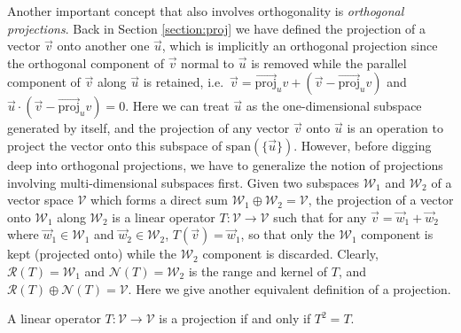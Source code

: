 Another important concept that also involves orthogonality is \textit{orthogonal projections}. Back in Section \ref{section:proj} we have defined the projection of a vector $\vec{v}$ onto another one $\vec{u}$, which is implicitly an orthogonal projection since the orthogonal component of $\vec{v}$ normal to $\vec{u}$ is removed while the parallel component of $\vec{v}$ along $\vec{u}$ is retained, i.e.\ $\vec{v} = \overrightarrow{\text{proj}}_u v + (\vec{v} - \overrightarrow{\text{proj}}_u v)$ and $\vec{u} \cdot (\vec{v} - \overrightarrow{\text{proj}}_u v) = 0$. Here we can treat $\vec{u}$ as the one-dimensional subspace generated by itself, and the projection of any vector $\vec{v}$ onto $\vec{u}$ is an operation to project the vector onto this subspace of $\text{span}(\{\vec{u}\})$. However, before digging deep into orthogonal projections, we have to generalize the notion of projections involving multi-dimensional subspaces first. Given two subspaces $\mathcal{W}_1$ and $\mathcal{W}_2$ of a vector space $\mathcal{V}$ which forms a direct sum $\mathcal{W}_1 \oplus \mathcal{W}_2 = \mathcal{V}$, the projection of a vector onto $\mathcal{W}_1$ along $\mathcal{W}_2$ is a linear operator $T:\mathcal{V} \to \mathcal{V}$ such that for any $\vec{v} = \vec{w}_1 + \vec{w}_2$ where $\vec{w}_1 \in \mathcal{W}_1$ and $\vec{w}_2 \in \mathcal{W}_2$, $T(\vec{v}) = \vec{w}_1$, so that only the $\mathcal{W}_1$ component is kept (projected onto) while the $\mathcal{W}_2$ component is discarded. Clearly, $\mathcal{R}(T) = \mathcal{W}_1$ and $\mathcal{N}(T) = \mathcal{W}_2$ is the range and kernel of $T$, and $\mathcal{R}(T) \oplus \mathcal{N}(T) = \mathcal{V}$. Here we give another equivalent definition of a projection.
\begin{proper}[Projection]
\label{proper:matrixproj}
A linear operator $T: \mathcal{V} \to \mathcal{V}$ is a projection if and only if $T^2 = T$.
\end{proper}
